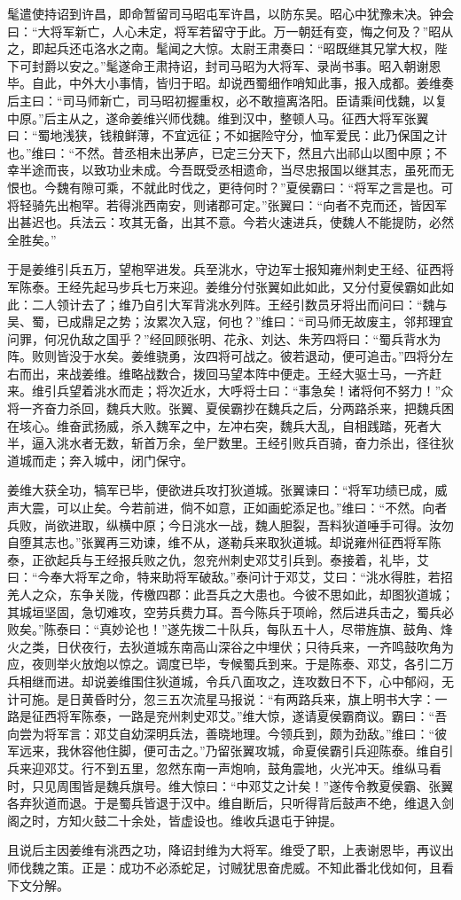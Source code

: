 髦遣使持诏到许昌，即命暂留司马昭屯军许昌，以防东吴。昭心中犹豫未决。钟会曰：“大将军新亡，人心未定，将军若留守于此。万一朝廷有变，悔之何及？”昭从之，即起兵还屯洛水之南。髦闻之大惊。太尉王肃奏曰：“昭既继其兄掌大权，陛下可封爵以安之。”髦遂命王肃持诏，封司马昭为大将军、录尚书事。昭入朝谢恩毕。自此，中外大小事情，皆归于昭。却说西蜀细作哨知此事，报入成都。姜维奏后主曰：“司马师新亡，司马昭初握重权，必不敢擅离洛阳。臣请乘间伐魏，以复中原。”后主从之，遂命姜维兴师伐魏。维到汉中，整顿人马。征西大将军张翼曰：“蜀地浅狭，钱粮鲜薄，不宜远征；不如据险守分，恤军爱民：此乃保国之计也。”维曰：“不然。昔丞相未出茅庐，已定三分天下，然且六出祁山以图中原；不幸半途而丧，以致功业未成。今吾既受丞相遗命，当尽忠报国以继其志，虽死而无恨也。今魏有隙可乘，不就此时伐之，更待何时？”夏侯霸曰：“将军之言是也。可将轻骑先出枹罕。若得洮西南安，则诸郡可定。”张翼曰：“向者不克而还，皆因军出甚迟也。兵法云：攻其无备，出其不意。今若火速进兵，使魏人不能提防，必然全胜矣。”

于是姜维引兵五万，望枹罕进发。兵至洮水，守边军士报知雍州刺史王经、征西将军陈泰。王经先起马步兵七万来迎。姜维分付张翼如此如此，又分付夏侯霸如此如此：二人领计去了；维乃自引大军背洮水列阵。王经引数员牙将出而问曰：“魏与吴、蜀，已成鼎足之势；汝累次入寇，何也？”维曰：“司马师无故废主，邻邦理宜问罪，何况仇敌之国乎？”经回顾张明、花永、刘达、朱芳四将曰：“蜀兵背水为阵。败则皆没于水矣。姜维骁勇，汝四将可战之。彼若退动，便可追击。”四将分左右而出，来战姜维。维略战数合，拨回马望本阵中便走。王经大驱士马，一齐赶来。维引兵望着洮水而走；将次近水，大呼将士曰：“事急矣！诸将何不努力！”众将一齐奋力杀回，魏兵大败。张翼、夏侯霸抄在魏兵之后，分两路杀来，把魏兵困在垓心。维奋武扬威，杀入魏军之中，左冲右突，魏兵大乱，自相践踏，死者大半，逼入洮水者无数，斩首万余，垒尸数里。王经引败兵百骑，奋力杀出，径往狄道城而走；奔入城中，闭门保守。

姜维大获全功，犒军已毕，便欲进兵攻打狄道城。张翼谏曰：“将军功绩已成，威声大震，可以止矣。今若前进，倘不如意，正如画蛇添足也。”维曰：“不然。向者兵败，尚欲进取，纵横中原；今日洮水一战，魏人胆裂，吾料狄道唾手可得。汝勿自堕其志也。”张翼再三劝谏，维不从，遂勒兵来取狄道城。却说雍州征西将军陈泰，正欲起兵与王经报兵败之仇，忽兖州刺史邓艾引兵到。泰接着，礼毕，艾曰：“今奉大将军之命，特来助将军破敌。”泰问计于邓艾，艾曰：“洮水得胜，若招羌人之众，东争关陇，传檄四郡：此吾兵之大患也。今彼不思如此，却图狄道城；其城垣坚固，急切难攻，空劳兵费力耳。吾今陈兵于项岭，然后进兵击之，蜀兵必败矣。”陈泰曰：“真妙论也！”遂先拨二十队兵，每队五十人，尽带旌旗、鼓角、烽火之类，日伏夜行，去狄道城东南高山深谷之中埋伏；只待兵来，一齐鸣鼓吹角为应，夜则举火放炮以惊之。调度已毕，专候蜀兵到来。于是陈泰、邓艾，各引二万兵相继而进。却说姜维围住狄道城，令兵八面攻之，连攻数日不下，心中郁闷，无计可施。是日黄昏时分，忽三五次流星马报说：“有两路兵来，旗上明书大字：一路是征西将军陈泰，一路是兖州刺史邓艾。”维大惊，遂请夏侯霸商议。霸曰：“吾向尝为将军言：邓艾自幼深明兵法，善晓地理。今领兵到，颇为劲敌。”维曰：“彼军远来，我休容他住脚，便可击之。”乃留张翼攻城，命夏侯霸引兵迎陈泰。维自引兵来迎邓艾。行不到五里，忽然东南一声炮响，鼓角震地，火光冲天。维纵马看时，只见周围皆是魏兵旗号。维大惊曰：“中邓艾之计矣！”遂传令教夏侯霸、张翼各弃狄道而退。于是蜀兵皆退于汉中。维自断后，只听得背后鼓声不绝，维退入剑阁之时，方知火鼓二十余处，皆虚设也。维收兵退屯于钟提。

且说后主因姜维有洮西之功，降诏封维为大将军。维受了职，上表谢恩毕，再议出师伐魏之策。正是：成功不必添蛇足，讨贼犹思奋虎威。不知此番北伐如何，且看下文分解。